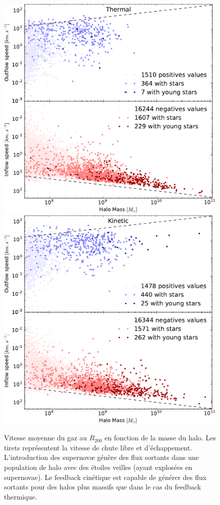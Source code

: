 \begin{figure}
	\centering
	\includegraphics[height=.45\textheight]{img/03/flux_speed_therm.pdf} 
	\includegraphics[height=.45\textheight]{img/03/flux_speed_kinetic.pdf} 
    \caption[Vitesse du gaz au $R_{200}$ 2]{Vitesse moyenne du gaz au $R_{200}$ en fonction de la masse du halo.
    Les tirets représentent la vitesse de chute libre et d'échappement.
    L'introduction des supernovæ génère des flux sortants dans une population de halo avec des étoiles veilles (ayant explosées en supernovae).
    Le feedback cinétique est capable de générer des flux sortants pour des halos plus massifs que dans le cas du feedback thermique.
 	\label{fig:R200speed2}}
\end{figure}

